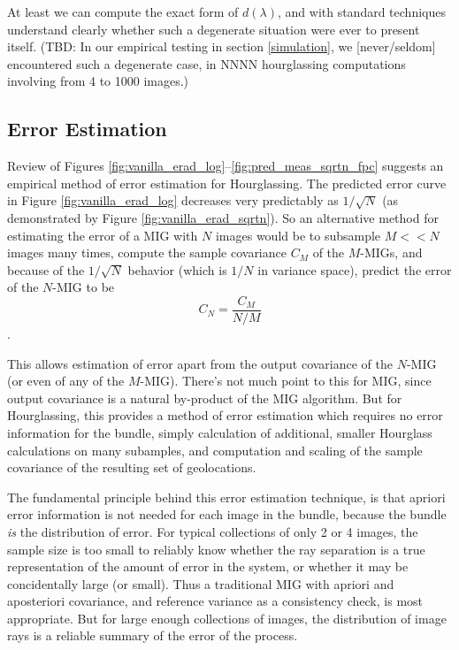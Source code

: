 \documentclass{amsart}
\begin{document}
At least we can compute the exact form of $d(\lambda)$, and with
standard techniques understand clearly whether such a degenerate
situation were ever to present itself. (TBD: In our empirical testing
in section \ref{simulation}, we [never/seldom] encountered such a
degenerate case, in NNNN hourglassing computations involving from 4 to
1000 images.)


\subsection{Error Estimation}
Review of Figures \ref{fig:vanilla_erad_log}--\ref{fig:pred_meas_sqrtn_fpc}
suggests an empirical method of error estimation for Hourglassing. The predicted
error curve in Figure \ref{fig:vanilla_erad_log} decreases very predictably as
$1/\sqrt N$ (as demonstrated by Figure \ref{fig:vanilla_erad_sqrtn}). So an
alternative method for estimating the error of a MIG with $N$ images would be to
subsample $M<<N$ images many times, compute the sample covariance $C_M$ of the
$M$-MIGs, and because of the $1/\sqrt N$ behavior (which is $1/N$ in variance
space), predict the error of the $N$-MIG to be $$C_N=\frac{C_M}{N/M}$$.

This allows estimation of error apart from the output covariance of the $N$-MIG
(or even of any of the $M$-MIG). There's not much point to this for MIG, since
output covariance is a natural by-product of the MIG algorithm. But for
Hourglassing, this provides a method of error estimation which requires no error
information for the bundle, simply calculation of additional, smaller Hourglass
calculations on many subamples, and computation and scaling of the sample
covariance of the resulting set of geolocations.

The fundamental principle behind this error estimation technique, is that
apriori error information is not needed for each image in the bundle, because
the bundle {\em is} the distribution of error. For typical collections of only 2
or 4 images, the sample size is too small to reliably know whether the ray
separation is a true representation of the amount of error in the system, or
whether it may be concidentally large (or small). Thus a traditional MIG with
apriori and aposteriori covariance, and reference variance as a consistency
check, is most appropriate. But for large enough collections of images, the
distribution of image rays is a reliable summary of the error of the process.
\end{document}
